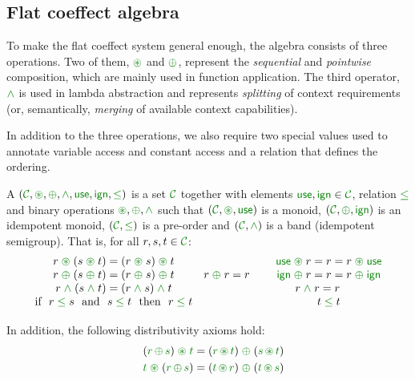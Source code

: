 
\subsection{Flat coeffect algebra}
\label{sec:flat-calculus-algebra}

To make the flat coeffect system general enough, the algebra consists of three operations.
Two of them, $\cseq$ and $\cpar$, represent the \emph{sequential} and \emph{pointwise} composition, 
which are mainly used in function application. The third operator, $\czip$ is used in lambda 
abstraction and represents \emph{splitting} of context requirements (or, semantically, \emph{merging} 
of available context capabilities). 

In addition to the three operations, we also require two special values used to annotate
variable access and constant access and a relation that defines the ordering.

\begin{definition}
A \emph{} $(\C, \cseq, \cpar, \czip, \cunit, \czero, \cleq)$ is a set 
$\C$ together with elements $\cunit, \czero \in \C$, relation $\cleq$ and binary operations 
$\cseq, \cpar, \czip$ such that $(\C, \cseq, \cunit)$ is a monoid, $(\C, \cpar, \czero)$ is an
idempotent monoid, $(\C, \cleq)$ is a pre-order and $(\C, \czip)$ is a band (idempotent semigroup). 
That is, for all $r,s,t\in \C$: 
%
\begin{equation*}
\begin{array}{ccc}
r \;\cseq\; (s \;\cseq\; t) = (r \;\cseq\; s) \;\cseq\; t &&
\cunit \;\cseq\; r = r = r \;\cseq\; \cunit 
\\
r \;\cpar\; (s \;\cpar\; t) = (r \;\cpar\; s) \;\cpar\; t &
r\; \cpar\; r = r~~~~&
\czero \;\cpar\; r = r = r \;\cpar\; \czero 
\\
r \;\czip\; (s \;\czip\; t) = (r \;\czip\; s) \;\czip\; t &&
r\; \czip\; r = r \qquad
\\
\textnormal{if}~~r\; \cleq\; s ~~\textnormal{and}~~s\; \cleq\; t~~\textnormal{then}~~r\; \cleq\; t &&
t\; \cleq\; t \\[0.5em]
\end{array}
\end{equation*}
%
In addition, the following distributivity axioms hold:
\begin{align*}
\quad (\cclrd{r}\, \cpar\, \cclrd{s}) \;\cseq\; \cclrd{t} & = (\cclrd{r} \,\cseq\, \cclrd{t}) \;\cpar\; (\cclrd{s}\, \cseq\, \cclrd{t}) \\
\quad \cclrd{t} \;\cseq\; (\cclrd{r}\, \cpar\, \cclrd{s}) & = (\cclrd{t} \,\cseq\, \cclrd{r}) \;\cpar\; (\cclrd{t}\, \cseq\, \cclrd{s})
\end{align*}
\end{definition}


